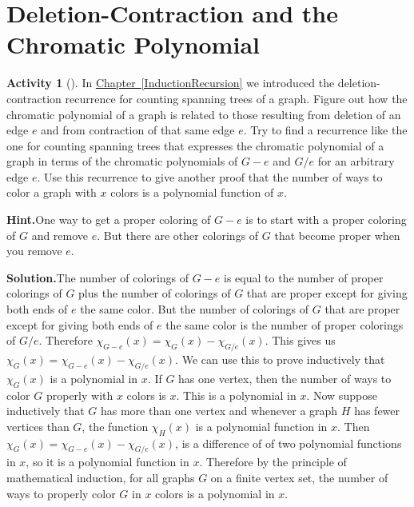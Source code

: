 \documentclass[10pt,]{book}
\theoremstyle{plain}
\theoremstyle{definition}
\newtheorem{activity}[project]{Activity}
\numberwithin{equation}{chapter}
\begin{document}
\section[{Deletion-Contraction and the Chromatic Polynomial}]{Deletion-Contraction and the Chromatic Polynomial}\label{sec_inclexcl-delcont}
\begin{activity}[]\label{chrompolydel_cont}
In \hyperref[InductionRecursion]{Chapter~\ref{InductionRecursion}} we introduced the deletion-contraction recurrence for counting spanning trees of a graph. Figure out how the chromatic polynomial of a graph is related to those resulting from deletion of an edge \(e\) and from contraction of that same edge \(e\). Try to find a recurrence like the one for counting spanning trees that expresses the chromatic polynomial of a graph in terms of the chromatic polynomials of \(G-e\) and \(G/e\) for an arbitrary edge \(e\). Use this recurrence to give another proof that the number of ways to color a graph with \(x\) colors is a polynomial function of \(x\).%
\par\medskip\noindent%
\textbf{Hint.}\quad One way to get a proper coloring of \(G-e\) is to start with a proper coloring of \(G\) and remove \(e\). But there are other colorings of \(G\) that become proper when you remove \(e\).%
\par\medskip\noindent%
\textbf{Solution.}\quad The number of colorings of \(G-e\) is equal to the number of proper colorings of \(G\) plus the number of colorings of \(G\) that are proper except for giving both ends of \(e\) the same color. But the number of colorings of \(G\) that are proper except for giving both ends of \(e\) the same color is the number of proper colorings of \(G/e\). Therefore \(\chi_{G-e}(x) =\chi_G(x)
-\chi_{G/e}(x)\). This gives us \(\chi_G(x) = \chi_{G-e}(x)
-\chi_{G/e}(x)\). We can use this to prove inductively that \(\chi_G(x)\) is a polynomial in \(x\). If \(G\) has one vertex, then the number of ways to color \(G\) properly with \(x\) colors is \(x\). This is a polynomial in \(x\). Now suppose inductively that \(G\) has more than one vertex and whenever a graph \(H\) has fewer vertices than \(G\), the function \(\chi_H(x)\) is a polynomial function in \(x\). Then \(\chi_G(x)= \chi_{G-e}(x)-\chi_{G/e}(x)\), is a difference of of two polynomial functions in \(x\), so it is a polynomial function in \(x\). Therefore by the principle of mathematical induction, for all graphs \(G\) on a finite vertex set, the number of ways to properly color \(G\) in \(x\) colors is a polynomial in \(x\).%
\end{activity}
\end{document}
